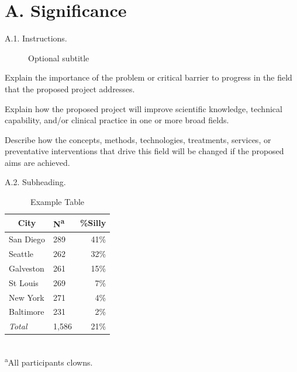 
\newpage

\section*{A. Significance}

\begin{description} %
	\item[A.1. Instructions.]{Optional subtitle}
\end{description}

Explain the importance of the problem or critical barrier to progress in the field that the proposed project addresses.

Explain how the proposed project will improve scientific knowledge, technical capability, and/or clinical practice in one or more broad fields.

Describe how the concepts, methods, technologies, treatments, services, or preventative interventions that drive this field will be changed if the proposed aims are achieved.

\begin{description}
	\item[A.2. Subheading.]{}
\end{description}

\begin{table} %
	\caption{Example Table}
	\begin{center}
		\begin{tabular}{l l r}
			\toprule
			\multicolumn{1}{c}{City} & {N\textsuperscript{a}} & {\%Silly}\\
			\midrule
			San Diego & 289 & 41\%\\
			Seattle & 262 & 32\%\\
			Galveston & 261 & 15\%\\
			St Louis & 269 & 7\%\\
			New York & 271 & 4\%\\
			Baltimore & 231 & 2\%\\
			\emph{Total} & 1,586 & 21\%\\
			\hline 
		\end{tabular}\\
		\footnotesize\textsuperscript{a}{All participants clowns.}
	\end{center}
	\label{tab:example}
\end{table}

